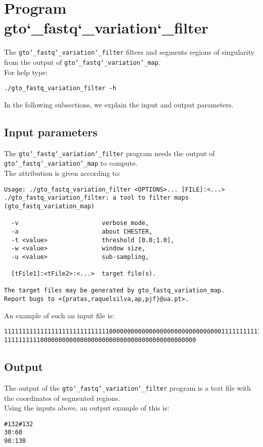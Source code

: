 \section{Program gto\char`_fastq\char`_variation\char`_filter}
The \texttt{gto\char`_fastq\char`_variation\char`_filter} filters and segments regions of singularity from the output of \texttt{gto\char`_fastq\char`_variation\char`_map}.\\
For help type:
\begin{lstlisting}
./gto_fastq_variation_filter -h
\end{lstlisting}
In the following subsections, we explain the input and output parameters.

\subsection*{Input parameters}

The \texttt{gto\char`_fastq\char`_variation\char`_filter} program needs the output of \texttt{gto\char`_fastq\char`_variation\char`_map} to compute.\\
The attribution is given according to:
\begin{lstlisting}
Usage: ./gto_fastq_variation_filter <OPTIONS>... [FILE]:<...>      
./gto_fastq_variation_filter: a tool to filter maps (gto_fastq_variation_map)  
                                                     
  -v                       verbose mode,             
  -a                       about CHESTER,            
  -t <value>               threshold [0.0;1.0],      
  -w <value>               window size,              
  -u <value>               sub-sampling,             
                                                     
  [tFile1]:<tFile2>:<...>  target file(s).           
                                                     
The target files may be generated by gto_fastq_variation_map.    
Report bugs to <{pratas,raquelsilva,ap,pjf}@ua.pt>. 
\end{lstlisting}
An example of such an input file is:
\begin{lstlisting}
1111111111111111111111111111100000000000000000000000000000001111111111111111111
11111111110000000000000000000000000000000000000000000
\end{lstlisting}

\subsection*{Output}
The output of the \texttt{gto\char`_fastq\char`_variation\char`_filter} program is a text file with the coordinates of segmented regions.\\
Using the inputs above, an output example of this is:
\begin{lstlisting}
#132#132
30:60
90:130
\end{lstlisting}